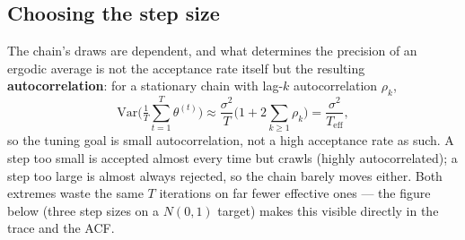 \documentclass[
  letterpaper,
  DIV=11,
  numbers=noendperiod]{scrreprt}
\begin{document}
\subsection{Choosing the step size}\label{choosing-the-step-size}

The chain's draws are dependent, and what determines the precision of an
ergodic average is not the acceptance rate itself but the resulting
\textbf{autocorrelation}: for a stationary chain with lag-\(k\)
autocorrelation \(\rho_k\), \[
\mathrm{Var}\Big(\tfrac1T\sum_{t=1}^T \theta^{(t)}\Big) \approx \frac{\sigma^2}{T}\Big(1 + 2\sum_{k \ge 1} \rho_k\Big) = \frac{\sigma^2}{T_\text{eff}},
\] so the tuning goal is small autocorrelation, not a high acceptance
rate as such. A step too small is accepted almost every time but crawls
(highly autocorrelated); a step too large is almost always rejected, so
the chain barely moves either. Both extremes waste the same \(T\)
iterations on far fewer effective ones --- the figure below (three step
sizes on a \(N(0,1)\) target) makes this visible directly in the trace
and the ACF.
\end{document}
